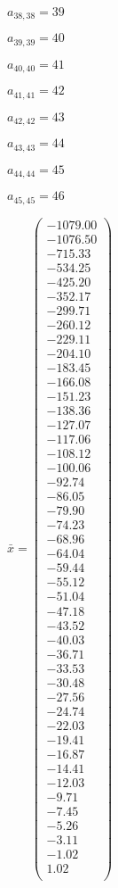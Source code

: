 \documentclass[a4paper,12pt]{article}
\begin{document}
$a _{ 38, 38 } = 39$

$a _{ 39, 39 } = 40$

$a _{ 40, 40 } = 41$

$a _{ 41, 41 } = 42$

$a _{ 42, 42 } = 43$

$a _{ 43, 43 } = 44$

$a _{ 44, 44 } = 45$

$a _{ 45, 45 } = 46$

$\bar { x } = \begin{pmatrix}
-1079.00 \\
-1076.50 \\
-715.33 \\
-534.25 \\
-425.20 \\
-352.17 \\
-299.71 \\
-260.12 \\
-229.11 \\
-204.10 \\
-183.45 \\
-166.08 \\
-151.23 \\
-138.36 \\
-127.07 \\
-117.06 \\
-108.12 \\
-100.06 \\
-92.74 \\
-86.05 \\
-79.90 \\
-74.23 \\
-68.96 \\
-64.04 \\
-59.44 \\
-55.12 \\
-51.04 \\
-47.18 \\
-43.52 \\
-40.03 \\
-36.71 \\
-33.53 \\
-30.48 \\
-27.56 \\
-24.74 \\
-22.03 \\
-19.41 \\
-16.87 \\
-14.41 \\
-12.03 \\
-9.71 \\
-7.45 \\
-5.26 \\
-3.11 \\
-1.02 \\
1.02 \\
\end{pmatrix}
$
\end{document}
